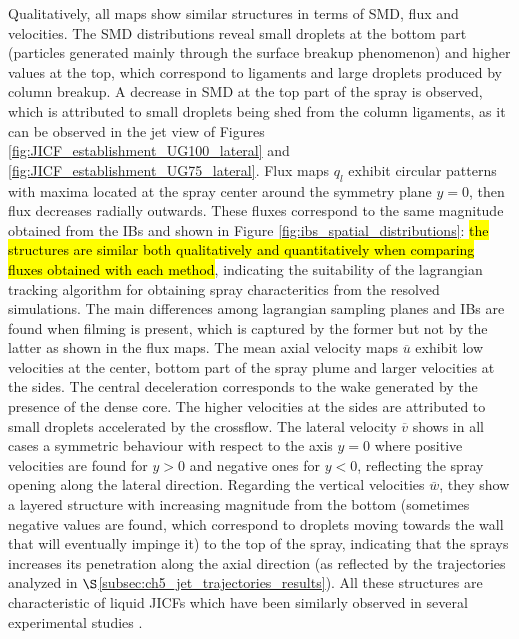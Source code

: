 Qualitatively, all maps show similar structures in terms of SMD, flux and velocities. The SMD distributions reveal small droplets at the bottom part (particles generated mainly through the surface breakup phenomenon) and higher values at the top, which correspond to ligaments and large droplets produced by column breakup. A decrease in SMD at the top part of the spray is observed, which is attributed to small droplets being shed from the column ligaments, as it can be observed in the jet view of Figures \ref{fig:JICF_establishment_UG100_lateral} and \ref{fig:JICF_establishment_UG75_lateral}. Flux maps $q_l$ exhibit circular patterns with maxima located at the spray center around the symmetry plane $y = 0$, then flux decreases radially outwards. These fluxes correspond to the same magnitude obtained from the IBs and shown in Figure \ref{fig:ibs_spatial_distributions}: \hl{the structures are similar both qualitatively and quantitatively when comparing fluxes obtained with each method}, indicating the suitability of the lagrangian tracking algorithm for obtaining spray characteritics from the resolved simulations. The main differences among lagrangian sampling planes and IBs are found when filming is present, which is captured by the former but not by the latter as shown in the flux maps. The mean axial velocity maps $\overline{u}$ exhibit low velocities at the center, bottom part of the spray plume and larger velocities at the sides. The central deceleration corresponds to the wake generated by the presence of the dense core. The higher velocities at the sides are attributed to small droplets accelerated by the crossflow. The lateral velocity $\overline{v}$ shows in all cases a symmetric behaviour with respect to the axis $y = 0$ where positive velocities are found for $y > 0$ and negative ones for $y < 0$, reflecting the spray opening along the lateral direction. Regarding the vertical velocities $\overline{w}$, they show a layered structure with increasing magnitude from the bottom (sometimes negative values are found, which correspond to droplets moving towards the wall that will eventually impinge it) to the top of the spray, indicating that the sprays increases its penetration along the axial direction (as reflected by the trajectories analyzed in $\S$\ref{subsec:ch5_jet_trajectories_results}). All these structures are characteristic of liquid JICFs which have been similarly observed in several experimental studies .

